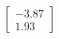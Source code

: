 \documentclass[preview]{standalone}
\begin{document}
\begin{align*}
\begin{bmatrix} -3.87 \\ 1.93 \end{bmatrix}
\end{align*}
\end{document}
